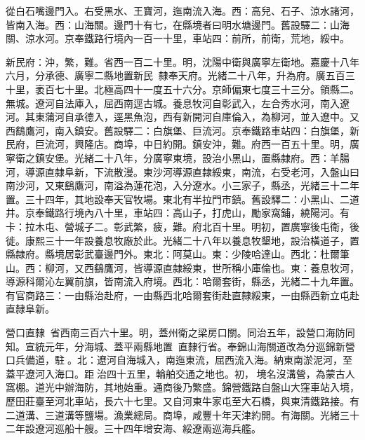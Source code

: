 \begin{pinyinscope}
從白石嘴邊門入。右受黑水、王寶河，迤南流入海。西：高兒、石子、涼水諸河，皆南入海。西：山海關。邊門十有七，在縣境者曰明水塘邊門。舊設驛二：山海關、涼水河。京奉鐵路行境內一百一十里，車站四：前所，前衛，荒地，綏中。

新民府：沖，繁，難。省西一百二十里。明，沈陽中衛與廣寧左衛地。嘉慶十八年六月，分承德、廣寧二縣地置新民，隸奉天府。光緒二十八年，升為府。廣五百三十里，袤百七十里。北極高四十一度五十六分。京師偏東七度三十三分。領縣二。無城。遼河自法庫入，屈西南逕古城。養息牧河自彰武入，左合秀水河，南入遼河。其東蒲河自承德入，逕黑魚泡，西有新開河自庫倫入，為柳河，並入遼中。又西鷂鷹河，南入鎮安。舊設驛二：白旗堡、巨流河。京奉鐵路車站四：白旗堡，新民府，巨流河，興隆店。商埠，中日約開。鎮安沖，難。府西一百五十里。明，廣寧衛之鎮安堡。光緒二十八年，分廣寧東境，設治小黑山，置縣隸府。西：羊腸河，導源直隸阜新，下流散漫。東沙河導源直隸綏東，南流，右受老河，入盤山曰南沙河，又東鷂鷹河，南溢為蓮花泡，入分遼水。小三家子，縣丞，光緒三十二年置。三十四年，其地設奉天官牧場。東北有半拉門市鎮。舊設驛二：小黑山、二道井。京奉鐵路行境內八十里，車站四：高山子，打虎山，勵家窩鋪，繞陽河。有卡：拉木屯、營城子二。彰武繁，疲，難。府北百十里。明初，置廣寧後屯衛，後徙。康熙三十一年設養息牧廠於此。光緒二十八年以養息牧墾地，設治橫道子，置縣隸府。縣境居彰武臺邊門外。東北：阿莫山。東：少陵哈達山。西北：杜爾筆山。西：柳河，又西鷂鷹河，皆導源直隸綏東，世所稱小庫倫也。東：養息牧河，導源科爾沁左翼前旗，皆南流入府境。西北：哈爾套街，縣丞，光緒二十九年置。有官商路三：一由縣治赴府，一由縣西北哈爾套街赴直隸綏東，一由縣西新立屯赴直隸阜新。

營口直隸：省西南三百六十里。明，蓋州衛之梁房口關。同治五年，設營口海防同知。宣統元年，分海城、蓋平兩縣地置，直隸行省。奉錦山海關道改為分巡錦新營口兵備道，駐。北：遼河自海城入，南迤東流，屈西流入海。納東南淤泥河，至蓋平遼河入海口。距治四十五里，輪舶交通之地也。初，境名沒溝營，為蒙古人窩棚。道光中辦海防，其地始重。通商後乃繁盛。錦營鐵路自盤山大窪車站入境，歷田莊臺至河北車站，長六十七里。又自河東牛家屯至大石橋，與東清鐵路接。有二道溝、三道溝等鹽場。漁業總局。商埠，咸豐十年天津約開。有海關。光緒三十二年設遼河巡船十艘。三十四年增安海、綏遼兩巡海兵艦。


\end{pinyinscope}
